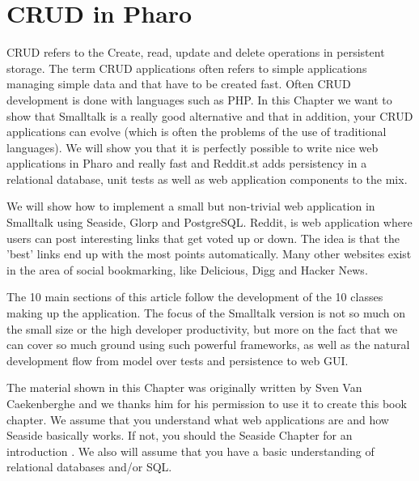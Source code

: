 \documentclass[a4paper,10pt,twoside]{book}
\begin{document}
\fi
\sloppy



\chapter{CRUD in Pharo}
\chapterauthor{\authorsven{}}

CRUD refers to the Create, read, update and delete operations in persistent storage. The term CRUD applications often refers to simple applications managing simple data and that have to be created fast. Often CRUD development is done with languages such as PHP. In this Chapter we want to show that Smalltalk is a really good alternative and that in addition, your CRUD applications can evolve (which is often the problems of the use of traditional languages). We will show you that it  is perfectly possible to write nice web applications in Pharo and really fast and 
Reddit.st adds persistency in a relational database, unit tests as well as web application components to the mix.

We will show how to implement a small but non-trivial web application in Smalltalk using Seaside, Glorp and PostgreSQL. Reddit, is web application where users can post interesting links that get voted up or down. The idea is that the 'best' links end up with the most points automatically. Many other websites exist in the area of social bookmarking, like Delicious, Digg and Hacker News.



The 10 main sections of this article follow the development of the 10 classes making up the application. The focus of the Smalltalk version is not so much on the small size or the high developer productivity, but more on the fact that we can cover so much ground using such powerful frameworks, as well as the natural development flow from model over tests and persistence to web GUI.

The material shown in this Chapter was originally written by Sven Van Caekenberghe and we thanks him for his permission to use it to create this book chapter.  We assume that you understand what web applications are and how Seaside basically works. If not, you should the Seaside Chapter for an introduction . We also will assume that you have a basic understanding of relational databases and/or SQL.
\end{document}
